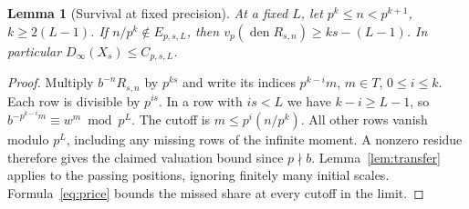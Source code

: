 \documentclass[11pt]{article}
\newtheorem{lemma}[theorem]{Lemma}
\newcommand{\dd}{D_{\infty}}
\newcommand{\den}{\operatorname{den}}
\begin{document}
\begin{lemma}[Survival at fixed precision]\label{lem:pass}
At a fixed \(L\), let \(p^k\le n<p^{k+1}\), \(k\ge 2(L-1)\). If \(n/p^k\notin E_{p,s,L}\), then \(v_p(\den R_{s,n})\ge ks-(L-1)\). In particular \(\dd(X_s)\le C_{p,s,L}\).
\end{lemma}
\begin{proof}
Multiply \(b^{-n}R_{s,n}\) by \(p^{ks}\) and write its indices \(p^{k-i}m\), \(m\in T\), \(0\le i\le k\). Each row is divisible by \(p^{is}\). In a row with \(is<L\) we have \(k-i\ge L-1\), so \(b^{-p^{k-i}m}\equiv w^m\bmod p^L\). The cutoff is \(m\le p^i(n/p^k)\). All other rows vanish modulo \(p^L\), including any missing rows of the infinite moment. A nonzero residue therefore gives the claimed valuation bound since \(p\nmid b\). Lemma~\ref{lem:transfer} applies to the passing positions, ignoring finitely many initial scales. Formula~\eqref{eq:price} bounds the missed share at every cutoff in the limit.
\end{proof}
\end{document}
